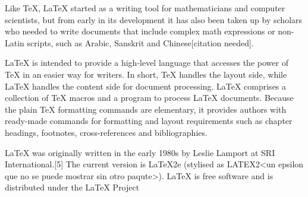 Like TeX, LaTeX started as a writing tool for mathematicians and computer scientists, but from early in its development it has also been taken up by scholars who needed to write documents that include complex math expressions or non-Latin scripts, such as Arabic, Sanskrit and Chinese[citation needed].

LaTeX is intended to provide a high-level language that accesses the power of TeX in an easier way for writers. In short, TeX handles the layout side, while LaTeX handles the content side for document processing. LaTeX comprises a collection of TeX macros and a program to process LaTeX documents. Because the plain TeX formatting commands are elementary, it provides authors with ready-made commands for formatting and layout requirements such as chapter headings, footnotes, cross-references and bibliographies.

LaTeX was originally written in the early 1980s by Leslie Lamport at SRI International.[5] The current version is LaTeX2e (stylised as LATEX2<un epsilon que no se puede mostrar sin otro paqute>). LaTeX is free software and is distributed under the LaTeX Project 

